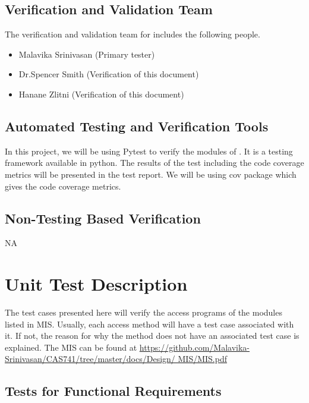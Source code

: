 \documentclass[12pt, titlepage]{article}
\begin{document}
\subsection{Verification and Validation Team}

The verification and validation team for \famname{} includes the following 
people.
\begin{itemize}
	\item Malavika Srinivasan (Primary tester)
	\item Dr.Spencer Smith (Verification of this document)
	\item Hanane Zlitni (Verification of this document)
\end{itemize}

\subsection{Automated Testing and Verification Tools}

In this project, we will be using Pytest to verify the modules of \famname{}. 
It is a testing framework available in python. The results of the test 
including the code coverage metrics will be presented in the test report. We 
will be using cov package which gives the code coverage metrics.



\subsection{Non-Testing Based Verification}

NA

\section{Unit Test Description}

The test cases presented here will verify the access programs of the modules 
listed in MIS. Usually, each access method will have a test case associated 
with it. If not, the reason for why the method does not have an associated test 
case is explained. The MIS can be found at 
\url{https://github.com/Malavika-Srinivasan/CAS741/tree/master/docs/Design/
	MIS/MIS.pdf}




\subsection{Tests for Functional Requirements}
\end{document}
